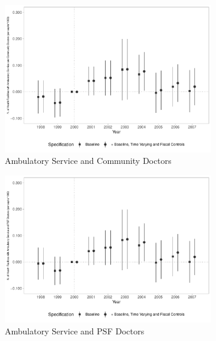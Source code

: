 \begin{figure}[h!]
\begin{center}
\begin{subfigure}{0.32\textwidth}
    \end{subfigure}
        \begin{subfigure}{0.32\textwidth}
        \caption{\scriptsize Ambulatory Service and Community Doctors}\label{fig:12c}
        \centering
        \includegraphics[width=\textwidth]{plots/sia_ncnes_medcom_pcapita_dist_ec29_baseline_dist_ec29_baseline_12.pdf}
    \end{subfigure}
    \begin{subfigure}{0.32\textwidth}
        \centering
        \caption{\scriptsize Ambulatory Service and PSF Doctors}\label{fig:12d}
        \includegraphics[width=\textwidth]{plots/sia_ncnes_medpsf_pcapita_dist_ec29_baseline_dist_ec29_baseline_12.pdf}
    \end{subfigure}
    \begin{subfigure}{0.32\textwidth}

\end{subfigure}
\end{center}
\end{figure}
